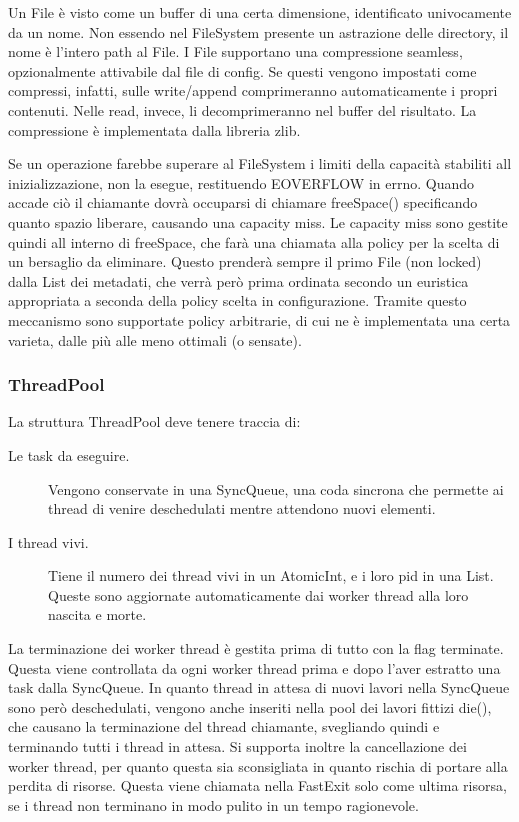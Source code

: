 \documentclass[11pt]{article}
\begin{document}
\begin{flushleft}
Un File è visto come un buffer di una certa dimensione, identificato univocamente da un nome. Non essendo nel FileSystem presente un astrazione delle directory, il nome è l'intero path al File.
I File supportano una compressione seamless, opzionalmente attivabile dal file di config. Se questi vengono impostati come compressi, infatti, sulle write/append comprimeranno automaticamente i propri contenuti. Nelle read, invece, li decomprimeranno nel buffer del risultato. La compressione è implementata dalla libreria zlib.

Se un operazione farebbe superare al FileSystem i limiti della capacità stabiliti all inizializzazione, non la esegue, restituendo EOVERFLOW in errno. Quando accade ciò il chiamante dovrà occuparsi di chiamare freeSpace() specificando quanto spazio liberare, causando una capacity miss.
Le capacity miss sono gestite quindi all interno di freeSpace, che farà una chiamata alla policy per la scelta di un bersaglio da eliminare. Questo prenderà sempre il primo File (non locked) dalla List dei metadati, che verrà però prima ordinata secondo un euristica appropriata a seconda della policy scelta in configurazione. Tramite questo meccanismo sono supportate policy arbitrarie, di cui ne è implementata una certa varieta, dalle più alle meno ottimali (o sensate).

\subsubsection{ThreadPool}

La struttura ThreadPool deve tenere traccia di:
\begin{description}

\item[Le task da eseguire.] Vengono conservate in una SyncQueue, una coda sincrona che permette ai thread di venire deschedulati mentre attendono nuovi elementi.

\item[I thread vivi.] Tiene il numero dei thread vivi in un AtomicInt, e i loro pid in una List. Queste sono aggiornate automaticamente dai worker thread alla loro nascita e morte.

\end{description}

La terminazione dei worker thread è gestita prima di tutto con la flag terminate. Questa viene controllata da ogni worker thread prima e dopo l'aver estratto una task dalla SyncQueue. In quanto thread in attesa di nuovi lavori nella SyncQueue sono però deschedulati, vengono anche inseriti nella pool dei lavori fittizi die(), che causano la terminazione del thread chiamante, svegliando quindi e terminando tutti i thread in attesa.
Si supporta inoltre la cancellazione dei worker thread, per quanto questa sia sconsigliata in quanto rischia di portare alla perdita di risorse. Questa viene chiamata nella FastExit solo come ultima risorsa, se i thread non terminano in modo pulito in un tempo ragionevole.


\end{flushleft}
\end{document}
